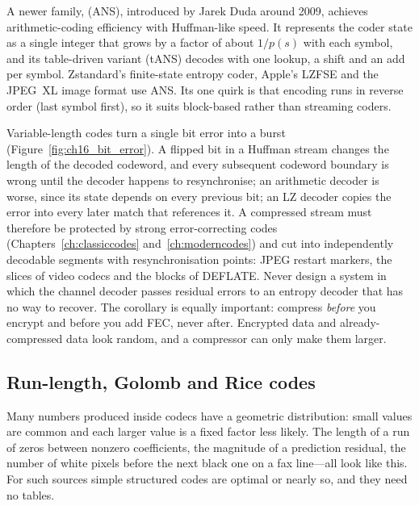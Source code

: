 A newer family,  (ANS), introduced by Jarek Duda around 2009,
achieves arithmetic-coding efficiency with Huffman-like speed. It represents the coder state as a
single integer that grows by a factor of about $1/p(s)$ with each symbol, and its table-driven
variant (tANS) decodes with one lookup, a shift and an add per symbol. Zstandard's finite-state
entropy coder, Apple's LZFSE and the JPEG~XL image format use ANS. Its one quirk is that
encoding runs in reverse order (last symbol first), so it suits block-based rather than streaming
coders.


\begin{pitfall}
Variable-length codes turn a single bit error into a burst (Figure~\ref{fig:ch16_bit_error}). A
flipped bit in a Huffman stream changes the length of the decoded codeword, and every subsequent
codeword boundary is wrong until the decoder happens to resynchronise; an arithmetic decoder is
worse, since its state depends on every previous bit; an LZ decoder copies the error into every
later match that references it. A compressed stream must therefore be protected by strong
error-correcting codes (Chapters~\ref{ch:classiccodes} and~\ref{ch:moderncodes}) and cut into
independently decodable segments with resynchronisation points: JPEG restart markers, the slices
of video codecs and the blocks of DEFLATE. Never design a system in which the channel decoder
passes residual errors to an entropy decoder that has no way to recover. The corollary is equally
important: compress \emph{before} you encrypt and before you add FEC, never after. Encrypted data
and already-compressed data look random, and a compressor can only make them larger.
\end{pitfall}

\subsection{Run-length, Golomb and Rice codes}

Many numbers produced inside codecs have a geometric distribution: small values are common and
each larger value is a fixed factor less likely. The length of a run of zeros between nonzero
coefficients, the magnitude of a prediction residual, the number of white pixels before the next
black one on a fax line---all look like this. For such sources simple structured codes are optimal
or nearly so, and they need no tables.

